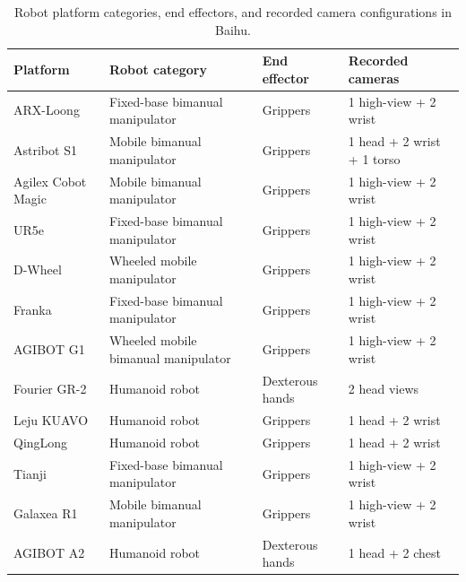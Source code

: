 \begin{table}[t]
\centering
\caption{Robot platform categories, end effectors, and recorded camera configurations in Baihu.}
\label{tab:robot-config}
\scriptsize
\renewcommand{\arraystretch}{1.08}
\begin{tabularx}{\textwidth}{@{}l l l X@{}}
\toprule
Platform & Robot category & End effector & Recorded cameras \\
\midrule
ARX-Loong & Fixed-base bimanual manipulator & Grippers & 1 high-view + 2 wrist \\
Astribot S1 & Mobile bimanual manipulator & Grippers & 1 head + 2 wrist + 1 torso \\
Agilex Cobot Magic & Mobile bimanual manipulator & Grippers & 1 high-view + 2 wrist \\
UR5e & Fixed-base bimanual manipulator & Grippers & 1 high-view + 2 wrist \\
D-Wheel & Wheeled mobile manipulator & Grippers & 1 high-view + 2 wrist \\
Franka & Fixed-base bimanual manipulator & Grippers & 1 high-view + 2 wrist \\
AGIBOT G1 & Wheeled mobile bimanual manipulator & Grippers & 1 high-view + 2 wrist \\
Fourier GR-2 & Humanoid robot & Dexterous hands & 2 head views \\
Leju KUAVO & Humanoid robot & Grippers & 1 head + 2 wrist \\
QingLong & Humanoid robot & Grippers & 1 head + 2 wrist \\
Tianji & Fixed-base bimanual manipulator & Grippers & 1 high-view + 2 wrist \\
Galaxea R1 & Mobile bimanual manipulator & Grippers & 1 high-view + 2 wrist \\
AGIBOT A2 & Humanoid robot & Dexterous hands & 1 head + 2 chest \\
\bottomrule
\end{tabularx}
\end{table}